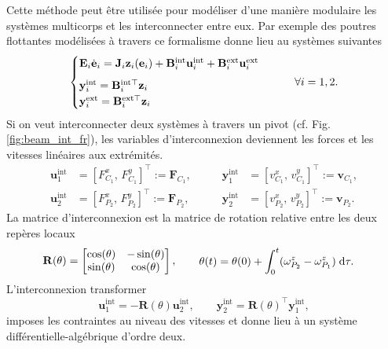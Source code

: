 Cette méthode peut être utilisée pour modéliser d'une manière modulaire les systèmes multicorps et les interconnecter entre eux. Par exemple des poutres flottantes modélisées à travers ce formalisme donne lieu au systèmes suivantes
\begin{equation*}
\begin{cases}
\mathbf{E}_i \dot{\mathbf{e}}_i = \mathbf{J}_i \mathbf{z}_i(\mathbf{e}_i) + \mathbf{B}_i^{\text{int}} \mathbf{u}_i^{\text{int}} + \mathbf{B}_i^{\text{ext}} \mathbf{u}_i^{\text{ext}}  \vspace{2mm} \\
\mathbf{y}_i^{\text{int}} = \mathbf{B}_i^{\text{int} \top}  \mathbf{z}_i \\
\mathbf{y}_i^{\text{ext}} = \mathbf{B}_i^{\text{ext} \top}  \mathbf{z}_i \\
\end{cases} \qquad \forall i = 1, 2.
\end{equation*}
Si on veut interconnecter deux systèmes à travers un pivot (cf. Fig. \ref{fig:beam_int_fr}), les variables d'interconnexion deviennent les forces et les vitesses linéaires  aux extrémités.
\begin{equation*}
\begin{aligned}
\mathbf{u}_1^{\text{int}} &= [F^x_{C_1}, \, F^y_{C_1}]^\top := \mathbf{F}_{C_1}, \\
\mathbf{u}_2^{\text{int}} &= [F^x_{P_2}, \, F^y_{P_2}]^\top := \mathbf{F}_{P_2},
\end{aligned} \qquad
\begin{aligned}
\mathbf{y}_1^{\text{int}} &= [v^x_{C_1}, \, v^y_{C_1}]^\top := \mathbf{v}_{C_1}, \\
\mathbf{y}_2^{\text{int}} &= [v^x_{P_2}, \, v^y_{P_2}]^\top := \mathbf{v}_{P_2}.
\end{aligned}
\end{equation*}
La matrice d'interconnexion est la matrice de rotation relative entre les deux repères locaux
\begin{equation*}
\mathbf{R}(\theta) = \begin{bmatrix}
\cos(\theta) & - \sin(\theta) \\
\sin(\theta) & \cos(\theta) \\
\end{bmatrix}, \qquad 
\begin{aligned}
\theta(t) &= \theta(0) + \int_{0}^t (\omega^z_{P_2} - \omega^z_{P_1}) \d{\tau}.
\end{aligned}
\end{equation*}
L'interconnexion transformer
\begin{equation*}
\mathbf{u}_1^{\text{int}} = -\mathbf{R}(\theta) \mathbf{u}_2^{\text{int}}, \qquad
\mathbf{y}_2^{\text{int}} = \mathbf{R}(\theta)^\top \mathbf{y}_1^{\text{int}},
\end{equation*}
imposes les contraintes au niveau des vitesses et donne lieu à un système différentielle-algébrique d'ordre deux.

